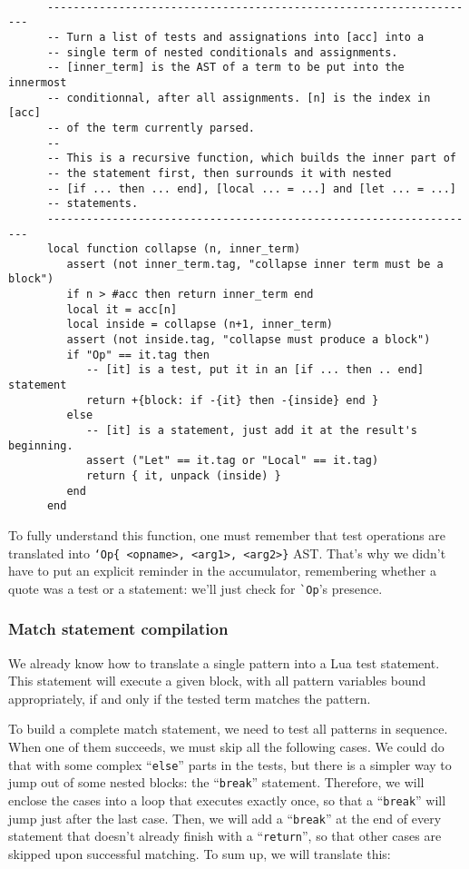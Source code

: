 \begin{Verbatim}[fontsize=\scriptsize]

      -------------------------------------------------------------------
      -- Turn a list of tests and assignations into [acc] into a
      -- single term of nested conditionals and assignments.
      -- [inner_term] is the AST of a term to be put into the innermost
      -- conditionnal, after all assignments. [n] is the index in [acc]
      -- of the term currently parsed.
      -- 
      -- This is a recursive function, which builds the inner part of
      -- the statement first, then surrounds it with nested 
      -- [if ... then ... end], [local ... = ...] and [let ... = ...]
      -- statements.
      -------------------------------------------------------------------
      local function collapse (n, inner_term)
         assert (not inner_term.tag, "collapse inner term must be a block")
         if n > #acc then return inner_term end
         local it = acc[n]
         local inside = collapse (n+1, inner_term)
         assert (not inside.tag, "collapse must produce a block")
         if "Op" == it.tag then 
            -- [it] is a test, put it in an [if ... then .. end] statement
            return +{block: if -{it} then -{inside} end }
         else 
            -- [it] is a statement, just add it at the result's  beginning.
            assert ("Let" == it.tag or "Local" == it.tag)
            return { it, unpack (inside) }
         end
      end
\end{Verbatim}

To fully understand this function, one must remember that test
operations are translated into {\tt`Op\{ <opname>, <arg1>, <arg2>\}}
AST. That's why we didn't have to put an explicit reminder in the
accumulator, remembering whether a quote was a test or a statement:
we'll just check for \verb|`Op|'s presence.

\subsubsection{Match statement compilation}
We already know how to translate a single pattern into a Lua test
statement. This statement will execute a given block, with all pattern
variables bound appropriately, if and only if the tested term matches
the pattern.

To build a complete match statement, we need to test all patterns in
sequence. When one of them succeeds, we must skip all the following
cases. We could do that with some complex ``\verb|else|'' parts in the
tests, but there is a simpler way to jump out of some nested blocks:
the ``\verb|break|'' statement. Therefore, we will enclose the cases
into a loop that executes exactly once, so that a ``\verb|break|''
will jump just after the last case. Then, we will add a
``\verb|break|'' at the end of every statement that doesn't already
finish with a ``\verb|return|'', so that other cases are skipped upon
successful matching. To sum up, we will translate this:

